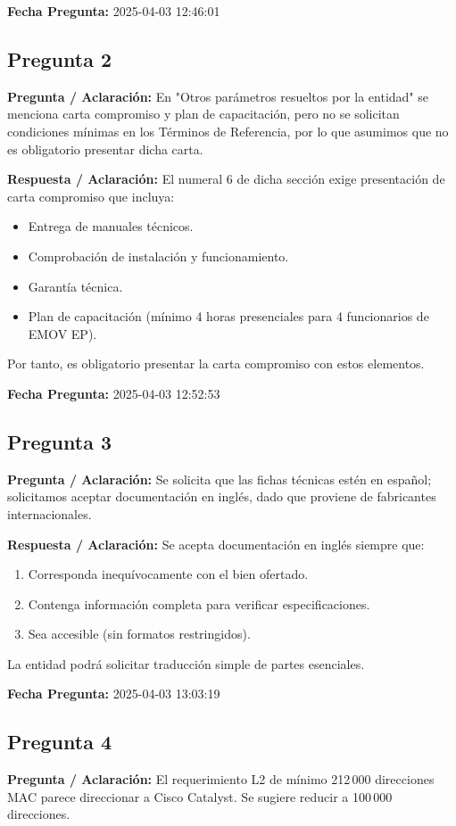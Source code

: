 \documentclass[12pt,a4paper]{article}
\begin{document}
\textbf{Fecha Pregunta:} 2025-04-03 12:46:01

\subsection*{Pregunta 2}
\textbf{Pregunta / Aclaración:}
En "Otros parámetros resueltos por la entidad" se menciona carta compromiso y plan de capacitación, pero no se solicitan condiciones mínimas en los Términos de Referencia, por lo que asumimos que no es obligatorio presentar dicha carta.

\textbf{Respuesta / Aclaración:}
El numeral 6 de dicha sección exige presentación de carta compromiso que incluya:
\begin{itemize}
  \item Entrega de manuales técnicos.  
  \item Comprobación de instalación y funcionamiento.  
  \item Garantía técnica.  
  \item Plan de capacitación (mínimo 4 horas presenciales para 4 funcionarios de EMOV EP).  
\end{itemize}
Por tanto, es obligatorio presentar la carta compromiso con estos elementos.

\textbf{Fecha Pregunta:} 2025-04-03 12:52:53

\subsection*{Pregunta 3}
\textbf{Pregunta / Aclaración:}
Se solicita que las fichas técnicas estén en español; solicitamos aceptar documentación en inglés, dado que proviene de fabricantes internacionales.

\textbf{Respuesta / Aclaración:}
Se acepta documentación en inglés siempre que:
\begin{enumerate}
  \item Corresponda inequívocamente con el bien ofertado.  
  \item Contenga información completa para verificar especificaciones.  
  \item Sea accesible (sin formatos restringidos).  
\end{enumerate}
La entidad podrá solicitar traducción simple de partes esenciales.

\textbf{Fecha Pregunta:} 2025-04-03 13:03:19

\subsection*{Pregunta 4}
\textbf{Pregunta / Aclaración:}
El requerimiento L2 de mínimo 212\,000 direcciones MAC parece direccionar a Cisco Catalyst. Se sugiere reducir a 100\,000 direcciones.
\end{document}
